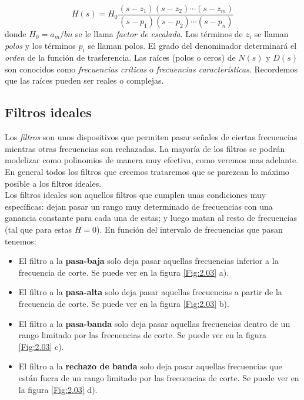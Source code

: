 \documentclass[12pt,a4paper]{article}
\numberwithin{equation}{section}
\numberwithin{figure}{section}
\begin{document}
\begin{equation}
H(s) = H_0 \dfrac{(s-z_1)(s-z_2)\cdots(s-z_m)}{(s-p_1)(s-p_2)\cdots (s-p_n)}
\end{equation}
donde $H_0 = a_m / bn$ se le llama \textit{factor de escalada}. Los términos de $z_i$ se llaman \textit{polos} y los términos $p_i$ se llaman polos. El grado del denominador determinará el \textit{orden} de la función de trasferencia. Las raíces (polos o ceros) de $N(s)$ y $D(s)$ son conocidos como \textit{frecuencias críticas} o \textit{frecuencias características}. Recordemos que las raíces pueden ser reales o complejas. 


\subsection{Filtros ideales}

Los \textit{filtros} son unos dispositivos que permiten pasar señales de ciertas frecuencias mientras otras frecuencias son rechazadas. La mayoría de los filtros se podrán modelizar como polinomios de manera muy efectiva, como veremos mas adelante. En general todos los filtros que creemos trataremos que se parezcan lo máximo posible a los filtros ideales. \\

Los filtros ideales son aquellos filtros que cumplen unas condiciones muy específicas: dejan pasar un rango muy determinado de frecuencias con una ganancia constante para cada una de estas; y luego matan al resto de frecuencias (tal que para estas $H=0$). En función del intervalo de frecuencias que pasan tenemos:

\begin{itemize}
\item El filtro a la \textbf{pasa-baja} solo deja pasar aquellas frecuencias inferior a la frecuencia de corte. Se puede ver en la figura \ref{Fig:2.03} a).
\item El filtro a la \textbf{pasa-alta} solo deja pasar aquellas frecuencias a partir de la frecuencia de corte. Se puede ver en la figura \ref{Fig:2.03} b).
\item El filtro a la \textbf{pasa-banda} solo deja pasar aquellas frecuencias dentro de un rango limitado por las frecuencias de corte. Se puede ver en la figura \ref{Fig:2.03} c).
\item El filtro a la \textbf{rechazo de banda} solo deja pasar aquellas frecuencias que están fuera de un rango limitado por las frecuencias de corte. Se puede ver en la figura \ref{Fig:2.03} d).
\end{itemize}
\end{document}
